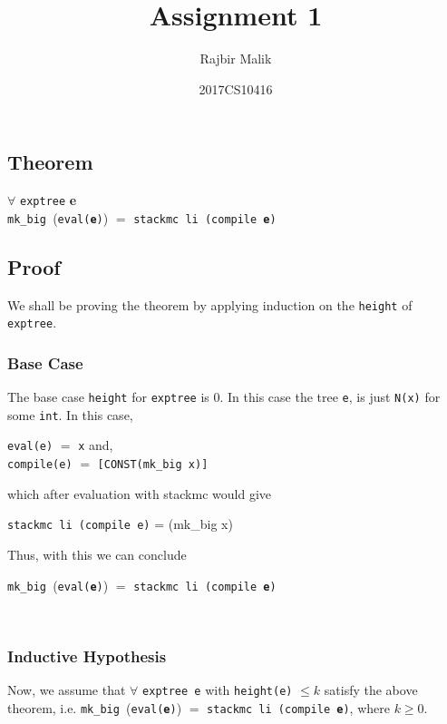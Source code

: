 \documentclass{article}
\title{Assignment 1}
\author{Rajbir Malik}
\date{2017CS10416}
\begin{document}
\maketitle
\subsection*{Theorem}

\begin{center}
\(\forall\) \texttt{exptree} \textbf{e} \\ \texttt{mk\_big }(\texttt{eval(\textbf{e})}) \(=\) \texttt{stackmc li (compile \textbf{e})} \\
\end{center}

\subsection*{Proof}
We shall be proving the theorem by applying induction on the \texttt{height} of \texttt{exptree}. \\
\subsubsection*{Base Case}
The base case \texttt{height} for \texttt{exptree} is 0. In this case the tree \texttt{e}, is just \texttt{N(x)} for some \texttt{int}.
In this case,
\begin{center}
    \texttt{eval(e)} \(=\) \texttt{x} and,\\
    \texttt{compile(e)} \(=\) \texttt{[CONST(mk\_big x)]} \\
\end{center}
    which after evaluation with stackmc would give
\begin{center}
    \texttt{stackmc li (compile e)} = (mk\_big x)
\end{center}
Thus, with this we can conclude
\begin{center}
    \texttt{mk\_big }(\texttt{eval(\textbf{e})}) \(=\) \texttt{stackmc li (compile \textbf{e})}
\end{center}
\phantom \\
\subsubsection*{Inductive Hypothesis}
Now, we assume that \( \forall \) \texttt{exptree e} with \texttt{height(e)} \(\leq k\) satisfy the above theorem, i.e. \texttt{mk\_big }(\texttt{eval(\textbf{e})}) \(=\) \texttt{stackmc li (compile \textbf{e})}, where \( k \geq 0\).
\phantom \\[10 pt]
\end{document}
